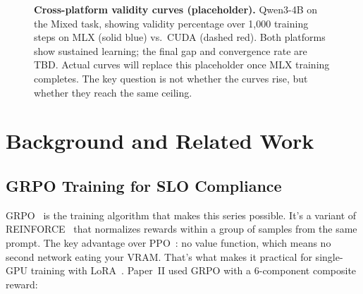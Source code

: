 \documentclass[11pt]{article}
\begin{document}
\begin{figure}[t]
\centering
{}
\caption{\textbf{Cross-platform validity curves (placeholder).}  Qwen3-4B on the Mixed task, showing validity percentage over 1{,}000 training steps on MLX (solid blue) vs.\ CUDA (dashed red).  Both platforms show sustained learning; the final gap and convergence rate are TBD.  Actual curves will replace this placeholder once MLX training completes.  The key question is not whether the curves rise, but whether they reach the same ceiling.}
\label{fig:cross-platform-validity}
\end{figure}


\section{Background and Related Work}

\subsection{GRPO Training for SLO Compliance}

GRPO~\citep{grpo} is the training algorithm that makes this series possible.  It's a variant of REINFORCE~\citep{williams1992reinforce} that normalizes rewards within a group of samples from the same prompt.  The key advantage over PPO~\citep{schulman2017ppo}: no value function, which means no second network eating your VRAM.  That's what makes it practical for single-GPU training with LoRA~\citep{hu2021lora}.  Paper~II used GRPO with a 6-component composite reward:
\end{document}
